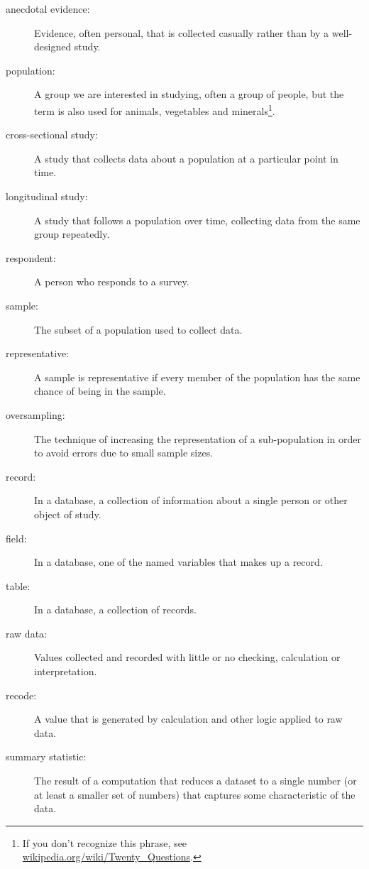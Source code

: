 \documentclass[12pt]{book}
\begin{document}
\begin{description}

\item[anecdotal evidence:] Evidence, often personal, that is collected
  casually rather than by a well-designed study.

\item[population:] A group we are interested in studying, often a
  group of people, but the term is also used for animals, vegetables
  and minerals\footnote{If you don't recognize this phrase, see
    \url{wikipedia.org/wiki/Twenty_Questions}.}.

\item[cross-sectional study:] A study that collects data about a
population at a particular point in time.

\item[longitudinal study:] A study that follows a population over
time, collecting data from the same group repeatedly.

\item[respondent:] A person who responds to a survey.

\item[sample:] The subset of a population used to collect data.

\item[representative:] A sample is representative if every member
of the population has the same chance of being in the sample.

\item[oversampling:] The technique of increasing the representation
of a sub-population in order to avoid errors due to small sample
sizes.

\item[record:] In a database, a collection of information about
a single person or other object of study.

\item[field:] In a database, one of the named variables that makes
up a record.

\item[table:] In a database, a collection of records.

\item[raw data:] Values collected and recorded with little or no
checking, calculation or interpretation.

\item[recode:] A value that is generated by calculation and other
logic applied to raw data.

\item[summary statistic:] The result of a computation that reduces
a dataset to a single number (or at least a smaller set of numbers)
that captures some characteristic of the data.


\end{description}
\end{document}
